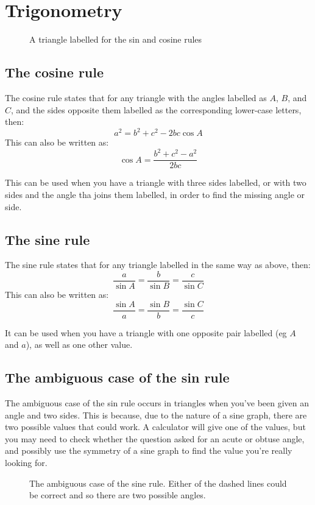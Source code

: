 \section{Trigonometry}
\begin{figure}[ht]
    \centering
    \caption{A triangle labelled for the sin and cosine rules}
    \label{fig:a-triangle-labelled-for-the-sin-and-cosine-rules}
\end{figure}
\subsection{The cosine rule}
The cosine rule states that for any triangle with the angles labelled as $A$, $B$, and $C$, and the sides opposite them labelled as the corresponding lower-case letters, then:
\begin{equation}
	a^2=b^2+c^2-2bc\cos{A}
\end{equation}
This can also be written as:
\begin{equation}
	\cos{A}=\frac{b^2+c^2-a^2}{2bc}
\end{equation}

This can be used when you have a triangle with three sides labelled, or with two sides and the angle tha joins them labelled, in order to find the missing angle or side.

\subsection{The sine rule}
The sine rule states that for any triangle labelled in the same way as above, then:
\begin{equation}
	\frac{a}{\sin{A}}=\frac{b}{\sin{B}}=\frac{c}{\sin{C}}
\end{equation}
This can also be written as:
\begin{equation}
	\frac{\sin{A}}{a}=\frac{\sin{B}}{b}=\frac{\sin{C}}{c}
\end{equation}

It can be used when you have a triangle with one opposite pair labelled (eg $A$ and $a$), as well as one other value.

\subsection{The ambiguous case of the sin rule}
The ambiguous case of the sin rule occurs in triangles when you've been given an angle and two sides. This is because, due to the nature of a sine graph, there are two possible values that could work. A calculator will give one of the values, but you may need to check whether the question asked for an acute or obtuse angle, and possibly use the symmetry of a sine graph to find the value you're really looking for.
\begin{figure}[ht]
    \centering
    \caption{The ambiguous case of the sine rule. Either of the dashed lines could be correct and so there are two possible angles.}
    \label{fig:the-ambiguous-case-of-the-sine-rule}
\end{figure}
